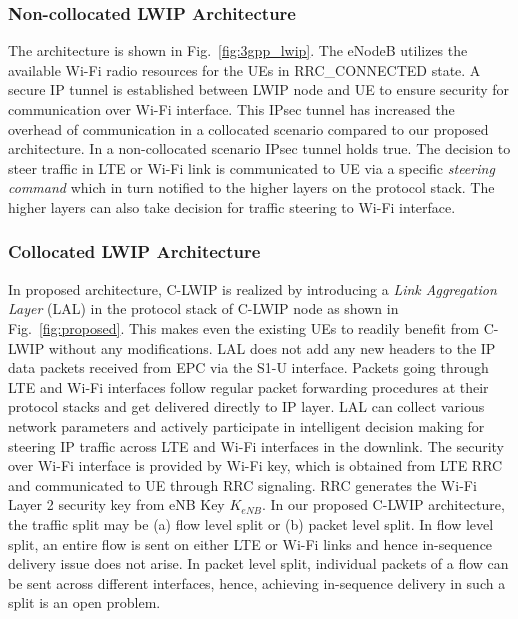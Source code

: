 \documentclass[conference]{IEEEtran}
\newcommand{\newly}[1]{{  #1}}
\begin{document}
\subsubsection{\textbf{Non-collocated LWIP Architecture}} 
The architecture is shown in Fig.~\ref{fig:3gpp_lwip}. The eNodeB utilizes the available Wi-Fi radio resources for the UEs in RRC\_CONNECTED state. A secure IP tunnel is established between LWIP node and UE to ensure security for communication over Wi-Fi interface. This IPsec tunnel has increased the overhead of communication in a collocated scenario compared to our proposed architecture. In a non-collocated scenario IPsec tunnel holds true. The decision to steer traffic in LTE or Wi-Fi link is communicated to UE via a specific \textit{steering command} which in turn notified to the higher layers on the protocol stack. The higher layers can also take decision for traffic steering to Wi-Fi interface.

\subsubsection{\textbf{Collocated LWIP Architecture}} 
In proposed architecture, C-LWIP is realized by introducing a \textit{Link Aggregation Layer} (LAL) in the protocol stack of C-LWIP node as shown in Fig.~\ref{fig:proposed}. This makes even the existing UEs to readily benefit from C-LWIP without any modifications. LAL does not add any new headers to the IP data packets received from EPC via the S1-U interface. Packets going through LTE and Wi-Fi interfaces follow regular packet forwarding procedures at their protocol stacks and get delivered directly to IP layer. LAL can collect various network parameters and actively participate in intelligent decision making for steering IP traffic across LTE and Wi-Fi interfaces in the downlink. The security over Wi-Fi interface is provided by Wi-Fi key, which is obtained from LTE RRC and communicated to UE through RRC signaling. RRC generates the Wi-Fi Layer 2 security key from eNB Key $K_{eNB}$. In our proposed C-LWIP architecture, the traffic split may be (a) flow level split or (b) packet level split. In flow level split, an entire flow is sent on either LTE or Wi-Fi links and hence in-sequence delivery issue does not arise. In packet level split, individual packets of a flow can be sent across different interfaces, hence, achieving in-sequence delivery in such a split is an open problem.

\end{document}

